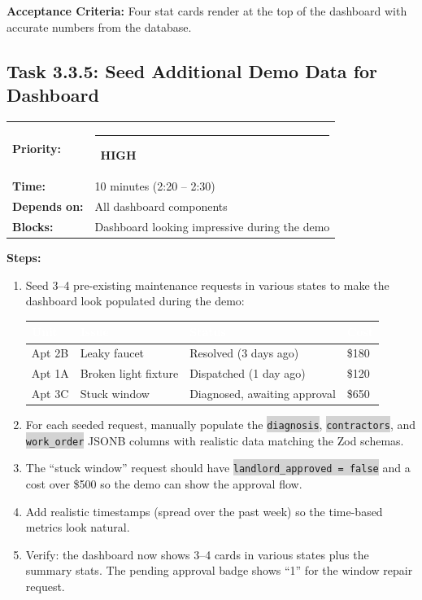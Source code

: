 \documentclass[11pt, a4paper]{article}
\newcommand{\highpri}{\textcolor{highamber}{\rule{6pt}{6pt}}~\textcolor{highamber}{\scriptsize\textbf{HIGH}}}
\newcommand{\code}[1]{\texttt{\small\colorbox{lightgray}{#1}}}
\begin{document}
\textbf{Acceptance Criteria:} Four stat cards render at the top of the dashboard with accurate numbers from the database.

\vspace{1em}

\subsection{Task 3.3.5: Seed Additional Demo Data for Dashboard}

\begin{tabularx}{\textwidth}{lX}
\textbf{Priority:} & \highpri \\
\textbf{Time:} & 10 minutes (2:20 -- 2:30) \\
\textbf{Depends on:} & All dashboard components \\
\textbf{Blocks:} & Dashboard looking impressive during the demo \\
\end{tabularx}

\vspace{0.3em}

\textbf{Steps:}
\begin{enumerate}[leftmargin=2em, itemsep=2pt]
  \item Seed 3--4 pre-existing maintenance requests in various states to make the dashboard look populated during the demo:

\begin{tabularx}{\textwidth}{|l|l|l|l|}
\hline
\rowcolor{primary}
\textcolor{white}{\textbf{Unit}} & \textcolor{white}{\textbf{Issue}} & \textcolor{white}{\textbf{Status}} & \textcolor{white}{\textbf{Cost}} \\
\hline
Apt 2B & Leaky faucet & Resolved (3 days ago) & \$180 \\
\hline
Apt 1A & Broken light fixture & Dispatched (1 day ago) & \$120 \\
\hline
Apt 3C & Stuck window & Diagnosed, awaiting approval & \$650 \\
\hline
\end{tabularx}

  \item For each seeded request, manually populate the \code{diagnosis}, \code{contractors}, and \code{work\_order} JSONB columns with realistic data matching the Zod schemas.

  \item The ``stuck window'' request should have \code{landlord\_approved = false} and a cost over \$500 so the demo can show the approval flow.

  \item Add realistic timestamps (spread over the past week) so the time-based metrics look natural.

  \item Verify: the dashboard now shows 3--4 cards in various states plus the summary stats. The pending approval badge shows ``1'' for the window repair request.
\end{enumerate}
\end{document}
